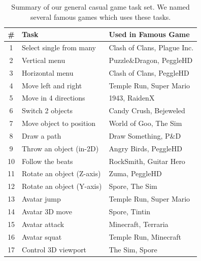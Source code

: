 \documentclass{sigchi}
\newcommand\tabhead[1]{\small\textbf{#1}}
\begin{document}
  \begin{table}
    \centering
    \begin{tabular}{|c|l|l|}
      \hline
      \tabhead{\#} &
      \multicolumn{1}{|p{0.4\columnwidth}|}{\centering\tabhead{Task}} &
      \multicolumn{1}{|p{0.45\columnwidth}|}{\centering\tabhead{Used in Famous Game}} \\
      \hline
      1 & Select single from many & Clash of Clans, Plague Inc.\\
      \hline
      2 & Vertical menu & Puzzle\&Dragon, PeggleHD \\
      \hline
      3 & Horizontal menu & Clash of Clans, PeggleHD\\
      \hline
      4 & Move left and right & Temple Run, Super Mario\\
      \hline
      5 & Move in 4 directions & 1943, RaidenX\\
      \hline
      6 & Switch 2 objects & Candy Crush, Bejeweled\\
      \hline
      7 & Move object to position & World of Goo, The Sim\\
      \hline
      8 & Draw a path & Draw Something, P\&D\\
      \hline
      9 & Throw an object (in-2D) & Angry Birds, PeggleHD\\
      \hline
      10 & Follow the beats & RockSmith, Guitar Hero\\
      \hline
      11 & Rotate an object (Z-axis) & Zuma, PeggleHD \\
      \hline
      12 & Rotate an object (Y-axis) & Spore, The Sim\\
      \hline
      13 & Avatar jump & Temple Run, Super Mario\\
      \hline
      14 & Avatar 3D move & Spore, Tintin\\
      \hline
      15 & Avatar attack & Minecraft, Terraria\\
      \hline
      16 & Avatar squat & Temple Run, Minecraft\\
      \hline
      17 & Control 3D viewport & The Sim, Spore\\
      \hline

    \end{tabular}
    \caption{Summary of our general casual game task set. We named several famous games which uses these tasks.}
    \label{tab:table1}
  \end{table}
\end{document}
